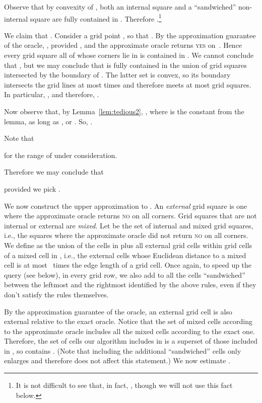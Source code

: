 \documentclass[11pt]{article}
\theoremstyle{remark}
\newcommand{\old}[1]{{{}}}
\begin{document}
\begin{enumerate}[(i)]
Observe that by convexity of , both an internal square and a ``sandwiched'' non-internal square are fully contained in .  Therefore .\footnote{It is not difficult to see that, in fact, , 
though we will not use this fact below.}



We claim that .  Consider a grid point , so that .  By the approximation guarantee of the oracle, , provided , and the approximate oracle returns \textsc{yes} on~.  Hence every grid square all of whose corners lie in  is contained in .  We cannot conclude that , but we may conclude that
 is fully contained in the union of grid squares intersected by the boundary of .  The latter set is convex, so its boundary intersects the grid lines at most  times and therefore meets at most  grid squares.  In particular,
, and therefore, 
.


Now observe that, by Lemma~\ref{lem:tedious2}, , where  is the constant from the lemma, as long as , or .
So, .

Note that

for the range of  under consideration.


Therefore we may conclude that

\old{
Therefore we may conclude that\footnote{We use the following identity: For four sets , , ,  with , .}

}
provided we pick .

We now construct the upper approximation  to .
An \emph{external} grid square is one where the approximate oracle returns \textsc{no} on all corners.  Grid squares that are not internal or external are \emph{mixed}. 
Let  be the set of internal and mixed grid squares, i.e., the squares where the approximate oracle did not return \textsc{no} on all corners.  We define  as the union of the cells in  plus all external grid cells within  grid cells of a mixed cell in , i.e., the external cells whose Euclidean distance to a mixed cell is at most ~times the edge length of a grid cell.  Once again, to speed up the query (see below), in every grid row, we also add to  all the cells ``sandwiched'' between the leftmost and the rightmost identified by the above rules, even if they don't satisfy the rules themselves.

By the approximation guarantee of the oracle, an external grid cell is also external relative to the exact oracle.
Notice that the set of mixed cells according to the approximate oracle includes all the mixed cells according to the exact one.  
Therefore, the set of cells our algorithm includes in  is a superset of those included in , so   contains .  (Note that including the additional ``sandwiched'' cells only enlarges  and therefore does not affect this statement.) 
We now estimate .


\end{enumerate}
\end{document}
